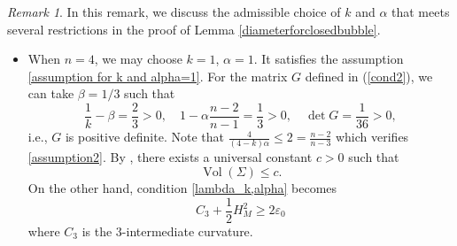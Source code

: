 \documentclass[11pt,letterpaper]{amsart}
\DeclareMathOperator{\Vol}{Vol}
\theoremstyle{definition}
\theoremstyle{remark}
\newtheorem{remark}[theorem]{Remark}
\numberwithin{equation}{section}
\begin{document}
\begin{remark}
In this remark, we discuss the admissible choice of $k$ and $\alpha$ that meets several restrictions in the proof of Lemma \ref{diameterforclosedbubble}.
\begin{itemize}
    \item[(1)] When $n=4$, we may choose $k=1$, $\alpha=1$. It satisfies the assumption \eqref{assumption for k and alpha=1}.
For the matrix $G$ defined in (\ref{cond2}), we can take $\beta=1/3$ such that
\begin{equation*}
    \frac{1}{k}-\beta=\frac{2}{3}>0,\quad 1-\alpha \frac{n-2}{n-1}=\frac{1}{3}>0, \quad \det G=\frac{1}{36}>0,
\end{equation*}
i.e., $G$ is positive definite. Note that $\frac{4}{(4-k)\alpha}\leqslant 2=\frac{n-2}{n-3}$ which verifies \eqref{assumption2}. By \cite[Theorem 1]{antonelli-xu}, there exists a universal constant $c>0$ such that
\begin{equation*}
    \Vol(\Sigma)\leqslant c.
\end{equation*}
On the other hand, condition \eqref{lambda_k,alpha} becomes
\[C_3+\frac{1}{2}H_M^2\geq 2\varepsilon_0\] where $C_3$ is the $3$-intermediate curvature.



\end{itemize}
\end{remark}
\end{document}
